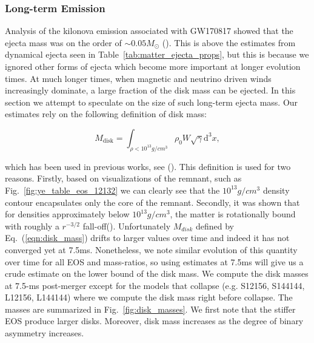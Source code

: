\subsubsection{Long-term Emission}
\label{sec:long_term}
Analysis of the kilonova emission associated with GW170817 showed that the ejecta mass was on the order of $\sim 0.05M_\odot$ (\cite{Metzger:2017wot,shibata2017gw170817}). This is above the estimates from dynamical ejecta seen in Table~\ref{tab:matter_ejecta_props}, but this is because we ignored other forms of ejecta which become more important at longer evolution times. At much longer times, when magnetic and neutrino driven winds increasingly dominate, a large fraction of the disk mass can be ejected. In this section we attempt to speculate on the size of such long-term ejecta mass. Our estimates rely on the following definition of disk mass:

\begin{equation}
  \label{eqn:disk_mass}
M_{\text{disk}} = \int_{\rho < 10^{13}g/cm^3} \rho_0 W \sqrt{\gamma} \mathrm{d}^3x,
\end{equation}

which has been used in previous works, see (\cite{radice2018binary,shibata2017gw170817}). This definition is used for two reasons. Firstly, based on visualizations of the remnant, such as Fig.~\ref{fig:ye_table_eos_12132} we can clearly see that the $10^{13}g/cm^3$ density contour encapsulates only the core of the remnant. Secondly, it was shown that for densities approximately below $10^{13}g/cm^3$, the matter is rotationally bound with roughly a $r^{-3/2}$ fall-off(\cite{hanauske2017rotational}). Unfortunately $M_{disk}$ defined by Eq.~(\ref{eqn:disk_mass}) drifts to larger values over time and indeed it has not converged yet at 7.5ms. Nonetheless, we note similar evolution of this quantity over time for all EOS and mass-ratios, so using estimates at 7.5ms will give us a crude estimate on the lower bound of the disk mass.  We compute the disk masses at 7.5-ms post-merger except for the models that collapse  (e.g. S12156, S144144, L12156, L144144) where we compute the disk mass right before collapse. The masses are summarized in Fig.~\ref{fig:disk_masses}. We first note that the stiffer EOS produce larger disks. Moreover, disk mass increases as the degree of binary asymmetry increases.


